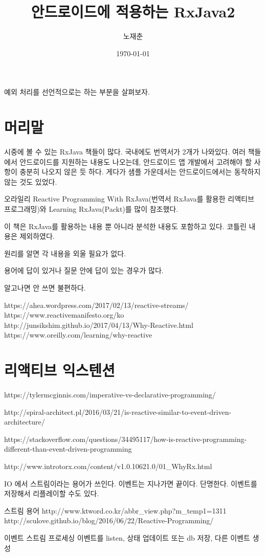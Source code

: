 \documentclass{book}
\title{안드로이드에 적용하는 RxJava2}
\author{노재춘}
\date{\today}
\begin{document}
 
\maketitle
예외 처리를 선언적으로는 하는 부분을 살펴보자.
\chapter*{머리말}
시중에 볼 수 있는 RxJava 책들이 많다. 국내에도 번역서가 2개가 나와있다. 
여러 책들에서 안드로이드를 지원하는 내용도 나오는데, 안드로이드 앱 개발에서 고려해야 할 사항이 충분히 나오지 않은 듯 하다. 게다가 샘플 가운데서는 안드로이드에서는 동작하지 않는 것도 있었다.

오라일리 Reactive Programming With RxJava(번역서 RxJava를 활용한 리액티브 프로그래밍)와 Learning RxJava(Packt)를 많이 참조했다.

이 책은 RxJava를 활용하는 내용 뿐 아니라 분석한 내용도 포함하고 있다.
코틀린 내용은 제외하였다.

원리를 알면 각 내용을 외울 필요가 없다. 

용어에 답이 있거나 질문 안에 답이 있는 경우가 많다.

알고나면 안 쓰면 불편하다.
\tableofcontents

https://ahea.wordpress.com/2017/02/13/reactive-streams/
https://www.reactivemanifesto.org/ko
http://junsikshim.github.io/2017/04/13/Why-Reactive.html
https://www.oreilly.com/learning/why-reactive

\chapter{리액티브 익스텐션}

https://tylermcginnis.com/imperative-vs-declarative-programming/

http://spiral-architect.pl/2016/03/21/is-reactive-similar-to-event-driven-architecture/

https://stackoverflow.com/questions/34495117/how-is-reactive-programming-different-than-event-driven-programming

http://www.introtorx.com/content/v1.0.10621.0/01_WhyRx.html

IO 에서 스트림이라는 용어가 쓰인다.
이벤트는 지나가면 끝이다. 단명한다. 이벤트를 저장해서 리플레이할 수도 있다.

스트림 용어
http://www.ktword.co.kr/abbr_view.php?m_temp1=1311
http://sculove.github.io/blog/2016/06/22/Reactive-Programming/

이벤트 스트림 프로세싱
이벤트를 listen, 상태 업데이트 또는 db 저장, 다른 이벤트 생성
\end{document}
